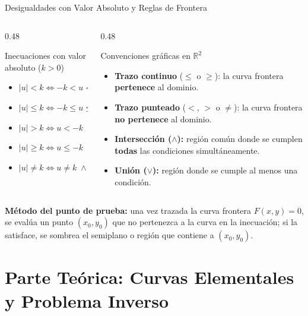 \documentclass[aspectratio=169,10pt]{beamer}
\begin{document}
\begin{frame}{Desigualdades con Valor Absoluto y Reglas de Frontera}
  \begin{columns}[T]
    \begin{column}{0.48\textwidth}
      \begin{block}{Inecuaciones con valor absoluto ($k > 0$)}
        \begin{itemize}
          \item $|u| < k \iff -k < u < k$
          \item $|u| \le k \iff -k \le u \le k$
          \item $|u| > k \iff u < -k \;\vee\; u > k$
          \item $|u| \ge k \iff u \le -k \;\vee\; u \ge k$
          \item $|u| \neq k \iff u \neq k \;\wedge\; u \neq -k$
        \end{itemize}
      \end{block}
    \end{column}
    \begin{column}{0.48\textwidth}
      \begin{block}{Convenciones gráficas en $\mathbb{R}^2$}
        \begin{itemize}
          \item \textbf{Trazo continuo} ($\le$ o $\ge$): la curva frontera \textbf{pertenece} al dominio.
          \item \textbf{Trazo punteado} ($<$, $>$ o $\neq$): la curva frontera \textbf{no pertenece} al dominio.
          \item \textbf{Intersección ($\wedge$):} región común donde se cumplen \textbf{todas} las condiciones simultáneamente.
          \item \textbf{Unión ($\vee$):} región donde se cumple al menos una condición.
        \end{itemize}
      \end{block}
    \end{column}
  \end{columns}

  \vspace{0.3cm}
  \textbf{Método del punto de prueba:} una vez trazada la curva frontera $F(x,y) = 0$, se evalúa un punto $(x_0, y_0)$ que no pertenezca a la curva en la inecuación; si la satisface, se sombrea el semiplano o región que contiene a $(x_0, y_0)$.
\end{frame}

\section{Parte Teórica: Curvas Elementales y Problema Inverso}
\end{document}
